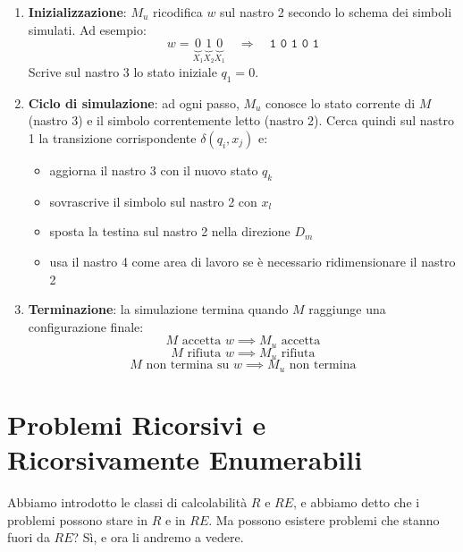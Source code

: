 \begin{enumerate}
  \item \textbf{Inizializzazione}: $ M_u $ ricodifica $ w $ sul nastro 2 secondo lo schema dei simboli simulati. Ad esempio:
    \[
      w = \underbrace{0}_{X_1}\underbrace{1}_{X_2}\underbrace{0}_{X_1} \quad \Longrightarrow \quad \texttt{1 0 1 0 1}
    \]
    Scrive sul nastro 3 lo stato iniziale $ q_1 = 0 $.

  \item \textbf{Ciclo di simulazione}: ad ogni passo, $ M_u $ conosce lo stato corrente di $ M $ (nastro 3) e il simbolo correntemente letto (nastro 2). Cerca quindi sul nastro 1 la transizione corrispondente $ \delta(q_i, x_j) $ e:
    \begin{itemize}
      \item aggiorna il nastro 3 con il nuovo stato $ q_k $
      \item sovrascrive il simbolo sul nastro 2 con $ x_l $
      \item sposta la testina sul nastro 2 nella direzione $ D_m $
      \item usa il nastro 4 come area di lavoro se è necessario ridimensionare il nastro 2
    \end{itemize}

  \item \textbf{Terminazione}: la simulazione termina quando $ M $ raggiunge una configurazione finale:
    \[
      M \text{ accetta } w \implies M_u \text{ accetta}
    \]
    \[
      M \text{ rifiuta } w \implies M_u \text{ rifiuta}
    \]
    \[
      M \text{ non termina su } w \implies M_u \text{ non termina}
    \]
\end{enumerate}


\section{Problemi Ricorsivi e Ricorsivamente Enumerabili}

Abbiamo introdotto le classi di calcolabilità $ R $ e $ RE $, e abbiamo detto che i problemi possono stare in $ R $ e in $ RE $. Ma possono esistere problemi che stanno fuori da $ RE $? Sì, e ora li andremo a vedere.

